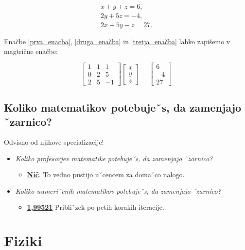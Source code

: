 \documentclass[12pt, a4paper]{article}
\begin{document}
\begin{gather} \label{prva_enacba}
x+y+z = 6, \\ \label{druga_enačba}
2y+5z = -4, \\ \label{tretja_enačba} 
2x+5y-z = 27.
\end{gather}

Enačbe \eqref{prva_enacba}, \eqref{druga_enačba} in \eqref{tretja_enačba} lahko zapišemo v magtrične enačbe:

\begin{equation*}
\begin{bmatrix}
1 & 1 & 1 \\
0 & 2 & 5 \\
2 & 5 & -1
\end{bmatrix}
\begin{bmatrix}
x \\
y \\
z
\end{bmatrix}
=
\begin{bmatrix}
6 \\
-4 \\
27
\end{bmatrix}
\end{equation*}

\subsection{Koliko matematikov potebujeˇs, da zamenjajo ˇzarnico?}

Odvisno od njihove specializacije!

\begin{itemize}
\item \textit{Koliko profesorjev matematike potebujeˇs, da zamenjajo ˇzarnico?}
\begin{itemize}
\item \underline{\textbf{Nič}}. To vedno pustijo uˇcencem za domaˇco nalogo.
\end{itemize}
\item \textit{Koliko numeriˇcnih matematikov potebujeˇs, da zamenjajo ˇzarnico?}
\begin{itemize}
\item \underline{\textbf{1{,}99521}} Pribliˇzek po petih korakih iteracije.
\end{itemize}
\end{itemize}

\section{Fiziki}
\end{document}
